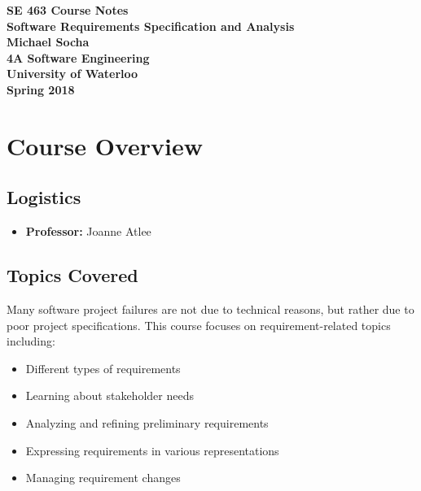 \documentclass[12pt,titlepage]{article}
\begin{document}
  \begin{titlepage}
    \vspace*{\fill}
    \centering

    \textbf{\Huge SE 463 Course Notes} \\ [0.4em]
    \textbf{\Large Software Requirements Specification and Analysis} \\ [1em]
    \textbf{\Large Michael Socha} \\ [1em]
    \textbf{\large 4A Software Engineering} \\
    \textbf{\large University of Waterloo} \\
    \textbf{\large Spring 2018} \\
    \vspace*{\fill}
  \end{titlepage}

  \newpage 


  \tableofcontents

  \newpage


  \section{Course Overview}
    \subsection{Logistics}
      \begin{itemize}
        \item \textbf{Professor:} Joanne Atlee
      \end{itemize}

    \subsection{Topics Covered}
      Many software project failures are not due to technical reasons, but rather due to poor project specifications. This course
      focuses on requirement-related topics including:
      \begin{itemize}
        \item Different types of requirements
        \item Learning about stakeholder needs
        \item Analyzing and refining preliminary requirements
        \item Expressing requirements in various representations
        \item Managing requirement changes
      \end{itemize}
\end{document}

